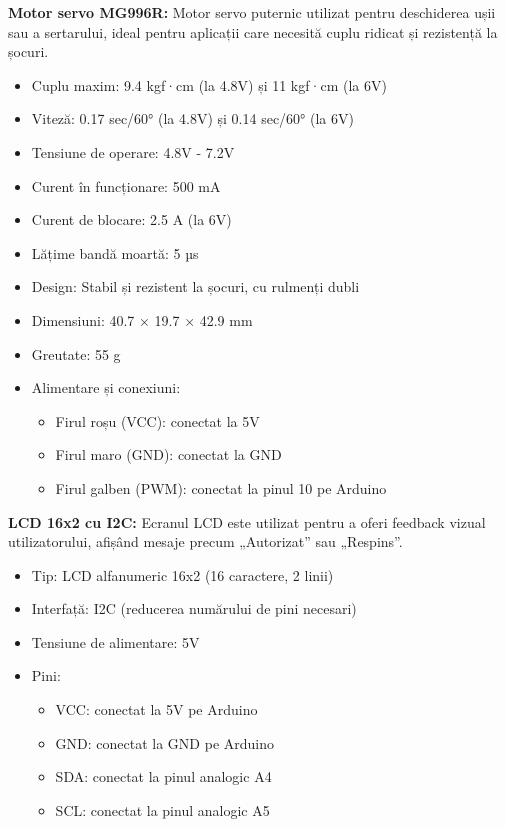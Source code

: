 \documentclass[a4paper,12pt]{report}
\begin{document}
\textbf{Motor servo MG996R:} Motor servo puternic utilizat pentru deschiderea ușii sau a sertarului, ideal pentru aplicații care necesită cuplu ridicat și rezistență la șocuri.
\begin{itemize}
    \item Cuplu maxim: 9.4 kgf·cm (la 4.8V) și 11 kgf·cm (la 6V)
    \item Viteză: 0.17 sec/60° (la 4.8V) și 0.14 sec/60° (la 6V)
    \item Tensiune de operare: 4.8V - 7.2V
    \item Curent în funcționare: 500 mA
    \item Curent de blocare: 2.5 A (la 6V)
    \item Lățime bandă moartă: 5 µs
    \item Design: Stabil și rezistent la șocuri, cu rulmenți dubli
    \item Dimensiuni: 40.7 × 19.7 × 42.9 mm
    \item Greutate: 55 g
    \item Alimentare și conexiuni:
    \begin{itemize}
        \item Firul roșu (VCC): conectat la 5V
        \item Firul maro (GND): conectat la GND
        \item Firul galben (PWM): conectat la pinul 10 pe Arduino
    \end{itemize}
\end{itemize}

\textbf{LCD 16x2 cu I2C:} Ecranul LCD este utilizat pentru a oferi feedback vizual utilizatorului, afișând mesaje precum „Autorizat” sau „Respins”.
\begin{itemize}
    \item Tip: LCD alfanumeric 16x2 (16 caractere, 2 linii)
    \item Interfață: I2C (reducerea numărului de pini necesari)
    \item Tensiune de alimentare: 5V
    \item Pini:
    \begin{itemize}
        \item VCC: conectat la 5V pe Arduino
        \item GND: conectat la GND pe Arduino
        \item SDA: conectat la pinul analogic A4
        \item SCL: conectat la pinul analogic A5
    \end{itemize}
\end{itemize}
\end{document}
